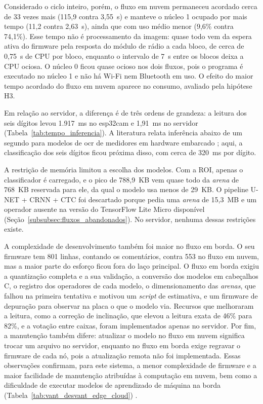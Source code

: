 Considerado o ciclo inteiro, porém, o fluxo em nuvem permaneceu acordado cerca de 33 vezes
mais (115,9 contra 3,55~s) e manteve o núcleo 1 ocupado por mais tempo (11,2 contra
2,63~s), ainda que com uso médio menor (9,6\% contra 74,1\%). Esse tempo não é
processamento da imagem: quase todo vem da espera ativa do firmware pela resposta do módulo
de rádio a cada bloco, de cerca de 0,75~s de CPU por bloco, enquanto o intervalo de 7~s
entre os blocos deixa a CPU ociosa. O núcleo 0 ficou quase ocioso nos dois fluxos, pois o
programa é executado no núcleo 1 e não há Wi-Fi nem Bluetooth em uso. O efeito do maior
tempo acordado do fluxo em nuvem aparece no consumo, avaliado pela hipótese H3.

Em relação ao servidor, a diferença é de três ordens de grandeza: a leitura dos seis
dígitos levou 1.917~ms no \gls{esp32cam} e 1,91~ms no servidor
(Tabela~\ref{tab:tempo_inferencia}). A literatura relata inferência abaixo de um segundo
para modelos de \gls{ocr} de medidores em hardware embarcado
\cite{ademola2023resource, jawas2018water}; aqui, a classificação dos seis dígitos ficou
próxima disso, com cerca de 320~ms por dígito.

A restrição de memória limitou a escolha dos modelos. Com a ROI, apenas o classificador é carregado, e o pico de
788,9~KB vem quase todo da \textit{arena} de 768~KB reservada para ele, da qual o modelo usa
menos de 29~KB. O
pipeline U-NET + CRNN + CTC foi descartado porque pedia uma \textit{arena} de
15,3~MB e um operador ausente na versão do TensorFlow Lite Micro disponível
(Seção~\ref{subsubsec:fluxos_abandonados}). No servidor, nenhuma dessas restrições existe.

A complexidade de desenvolvimento também foi maior no fluxo em borda. O seu firmware tem
801 linhas, contando os comentários, contra 553 no fluxo em nuvem, mas a maior parte do
esforço ficou fora do laço principal. O fluxo em borda exigiu a quantização completa e a sua validação, a conversão
dos modelos em cabeçalhos C, o registro dos operadores de cada modelo, o dimensionamento das
\textit{arenas}, que falhou na primeira tentativa e motivou um \textit{script} de
estimativa, e um firmware de depuração para observar na placa o que o modelo via.
Recursos que melhoraram a leitura, como a correção de inclinação, que elevou a leitura exata
de 46\% para 82\%, e a votação entre caixas, foram implementados apenas no servidor. Por
fim, a manutenção também difere: atualizar o modelo no fluxo em nuvem significa trocar um
arquivo no servidor, enquanto no fluxo em borda exige regravar o firmware de cada nó, pois
a atualização remota não foi implementada. Essas observações confirmam, para este sistema,
a menor complexidade de firmware e a maior facilidade de manutenção atribuídas à computação
em nuvem, bem como a dificuldade de executar modelos de aprendizado de máquina na borda
(Tabela~\ref{tab:vant_desvant_edge_cloud}) \cite{andriulo2024edge}.

